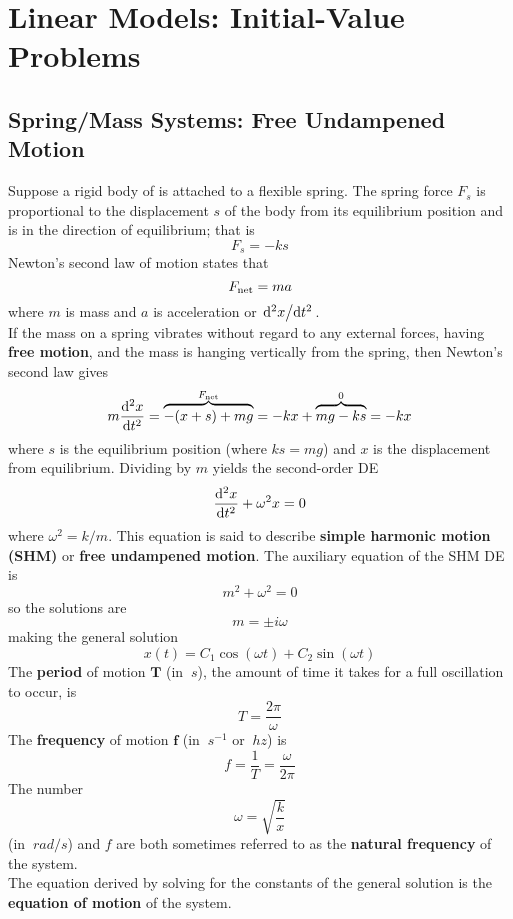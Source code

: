 \documentclass[./Differential Equations.tex]{subfiles}
\begin{document}
	\section{Linear Models: Initial-Value Problems}
		\subsection{Spring/Mass Systems: Free Undampened Motion}
				Suppose a rigid body of is attached to a flexible spring. The spring force \(F_s\) is proportional to the displacement \(s\) of the body from its equilibrium position and is in the direction of equilibrium; that is
					\[F_s = -ks\]
				Newton's second law of motion states that
					\[F_{\text{net}} = ma\]
					where \(m\) is mass and \(a\) is acceleration or \(\dv*[2]{x}{t}\). \\
				If the mass on a spring vibrates without regard to any external forces, having \textbf{free motion}, and the mass is hanging vertically from the spring, then Newton's second law gives
					\[
						m\dv[2]{x}{t} = \overset{F_{\text{net}}}{\overbrace{-(x + s) + mg}}
							= -kx + \overset{0}{\overbrace{mg - ks}} 
							= -kx
					\]
					where \(s\) is the equilibrium position (where \(ks = mg\)) and \(x\) is the displacement from equilibrium.
				Dividing by \(m\) yields the second-order DE
					\[\dv[2]{x}{t} + \omega^2x = 0\]
					where \(\omega^2 = k/m\). This equation is said to describe \textbf{simple harmonic motion (SHM)} or \textbf{free undampened motion}.
				The auxiliary equation of the SHM DE is
					\[m^2 + \omega^2 = 0\]
					so the solutions are
					\[m = \pm i\omega\]
					making the general solution
					\[x(t) = C_1\cos(\omega t) + C_2\sin(\omega t)\]
				The \textbf{period} of motion \(\bm{T}\) (in \(\SI{}{s}\)), the amount of time it takes for a full oscillation to occur, is
					\[T = \frac{2\pi}{\omega}\]
					The \textbf{frequency} of motion \(\bm{f}\) (in \(\SI{}{s^{-1}}\) or \(\SI{}{hz}\)) is
					\[f = \frac{1}{T} = \frac{\omega}{2\pi}\]
					The number
					\[\omega = \sqrt{\frac{k}{x}}\]
					(in \(\SI{}{rad/s}\)) and \(f\) are both sometimes referred to as the \textbf{natural frequency} of the system. \\
					The equation derived by solving for the constants of the general solution is the \textbf{equation of motion} of the system.
\end{document}
